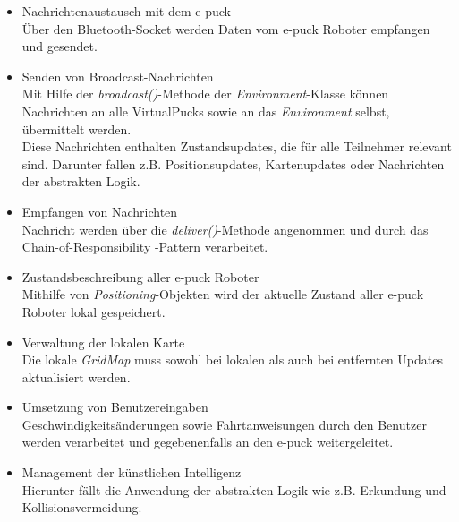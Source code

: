\documentclass[10pt,a4paper]{article}
\begin{document}
		\begin{itemize}
			\item Nachrichtenaustausch mit dem e-puck \\
				Über den Bluetooth-Socket werden Daten vom e-puck Roboter empfangen und gesendet.
			\item Senden von Broadcast-Nachrichten \\
				Mit Hilfe der \textit{broadcast()}-Methode der \textit{Environment}-Klasse können Nachrichten an alle
				VirtualPucks sowie an das \textit{Environment} selbst, übermittelt werden. \\
				Diese Nachrichten enthalten	Zustandsupdates, die für alle Teilnehmer relevant sind. Darunter fallen z.B.
				Positionsupdates, Kartenupdates oder Nachrichten der abstrakten Logik.
			\item Empfangen von Nachrichten  \\
				Nachricht werden über die \textit{deliver()}-Methode angenommen und durch das Chain-of-Responsibility
				-Pattern verarbeitet.
			\item Zustandsbeschreibung aller e-puck Roboter \\
				Mithilfe von \textit{Positioning}-Objekten wird der aktuelle Zustand aller e-puck Roboter lokal gespeichert.
			\item Verwaltung der lokalen Karte \\
				Die lokale \textit{GridMap} muss sowohl bei lokalen als auch bei entfernten Updates aktualisiert werden. 
			\item Umsetzung von Benutzereingaben \\
				Geschwindigkeitsänderungen sowie Fahrtanweisungen durch den Benutzer werden verarbeitet und gegebenenfalls
				an den e-puck weitergeleitet.
			\item Management der künstlichen Intelligenz \\
				Hierunter fällt die Anwendung der abstrakten Logik wie z.B. Erkundung und Kollisionsvermeidung.
		\end{itemize} 
  		
\end{document}
